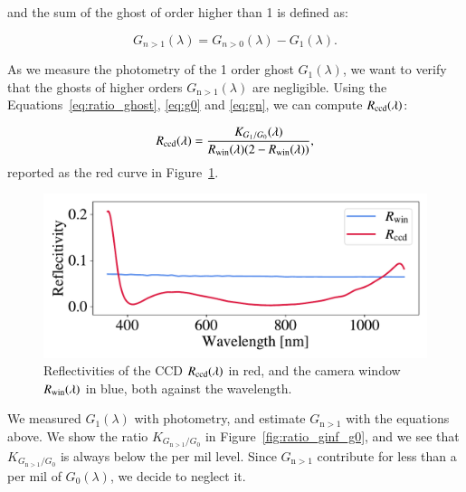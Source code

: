 \noindent and the sum of the ghost of order higher than 1 is defined as:

 \begin{equation}
     G_{n>1}(\lambda) = G_{n>0}(\lambda) - G_1(\lambda).
     \label{eq:sum_ghost_sup_1}
 \end{equation}

\noindent As we measure the photometry of the 1 order ghost $G_1(\lambda)$, we want to verify that the ghosts of higher orders $G_{\mathrm{n}>1}(\lambda)$ are negligible. Using the Equations~\ref{eq:ratio_ghost}, \ref{eq:g0} and \ref{eq:gn}, we can compute $R_{\mathrm{ccd}}(\lambda)$:

\begin{equation}
    R_{\mathrm{ccd}}(\lambda) = \frac{K_{G_1/G_0}(\lambda)}{R_{\mathrm{win}}(\lambda) (2 - R_{\mathrm{win}}(\lambda))},
    \label{eq:rccd}
\end{equation}
reported as the red curve in Figure~\ref{fig:reflectivities}.

\begin{figure}[h]
    \centering
    \includegraphics[width=\columnwidth]{fig/reflectivities.pdf}
    \caption{Reflectivities of the CCD $R_{\mathrm{ccd}}(\lambda)$ in red, and the camera window $R_{\mathrm{win}}(\lambda)$ in blue, both against the wavelength.}
    \label{fig:reflectivities}
\end{figure}


We measured $G_1(\lambda)$ with photometry, and estimate $G_{\mathrm{n}>1}$ with the equations above. We show the ratio $K_{G_{\mathrm{n}>1}/G_0}$ in Figure~\ref{fig:ratio_ginf_g0}, and we see that $K_{G_{\mathrm{n}>1}/G_0}$ is always below the per mil level. Since $G_{\mathrm{n}>1}$ contribute for less than a per mil of $G_0(\lambda)$, we decide to neglect it.

